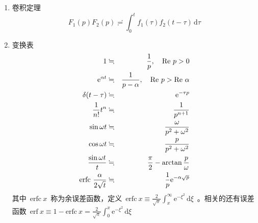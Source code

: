 \documentclass[12pt,a4paper]{article}
\newcommand\diff{\,\mathrm{d}}
\renewcommand{\[}{\ $\displaystyle}
\renewcommand{\]}{$\ }%
\newcommand\mi{\mathrm{i}}
\newcommand\e{\mathrm{e}}
\begin{document}
\begin{enumerate}
	   \item 卷积定理
	   	$$
	   	  F_1(p)F_2(p) \risingdotseq \int_0^t f_1(\tau)f_2(t-\tau)\diff\tau
	   	$$
	   \item 变换表
	   	\begin{eqnarray*}
	   	  1 &\fallingdotseq & \frac 1p ,\quad \re p>0 \\
	   	  \e^{\alpha t} &\fallingdotseq & \frac{1}{p-\alpha} , \quad \re p>\re \alpha \\
	   	  \delta(t-\tau) &\fallingdotseq & \e^{-\tau p} \\
	   	  \frac 1{n!} t^n &\fallingdotseq & \frac 1{p^{n+1}}\\
	   	  \sin \omega t &\fallingdotseq & \frac{\omega}{p^2+\omega^2} \\
	   	  \cos \omega t &\fallingdotseq & \frac{p}{p^2+\omega^2} \\
	   	  \frac{\sin\omega t}{t} &\fallingdotseq & \frac \pi 2 - \arctan \frac p\omega \\
	   	  \mathrm{erfc}~ \frac{\alpha}{2\sqrt t} &\fallingdotseq & \frac 1p \e^{-\alpha\sqrt{p}}
	   	\end{eqnarray*}
	   	其中\[\mathrm{erfc}~x\]称为余误差函数，定义\[\mathrm{erfc}~x \equiv \frac{2}{\sqrt{\pi}}\int_x^\infty \e^{-\xi^2}\diff\xi\]。相关的还有误差函数\[\mathrm{erf}~x \equiv 1-\mathrm{erfc}~x = \frac{2}{\sqrt{\pi}}\int_0^x \e^{-\xi^2}\diff\xi\]
	 \end{enumerate}
	 
\end{document}
